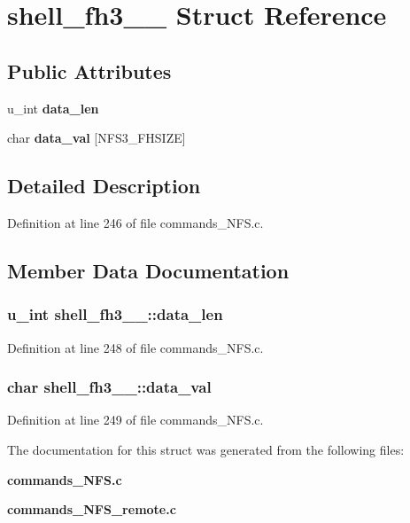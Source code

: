 \section{shell\_\-fh3\_\-\_\- Struct Reference}
\label{structshell__fh3____}
\subsection*{Public Attributes}
\begin{CompactItemize}
\item 
u\_\-int {\bf data\_\-len}
\item 
char {\bf data\_\-val} [NFS3\_\-FHSIZE]
\end{CompactItemize}


\subsection{Detailed Description}


Definition at line 246 of file commands\_\-NFS.c.

\subsection{Member Data Documentation}
\subsubsection[{data\_\-len}]{\setlength{\rightskip}{0pt plus 5cm}u\_\-int {\bf shell\_\-fh3\_\-\_\-::data\_\-len}}\label{structshell__fh3_____c6f85b37736c75dd12c1c37d1df0cfe5}




Definition at line 248 of file commands\_\-NFS.c.
\subsubsection[{data\_\-val}]{\setlength{\rightskip}{0pt plus 5cm}char {\bf shell\_\-fh3\_\-\_\-::data\_\-val}}\label{structshell__fh3_____3d763c4c25800302c7d0db07a186e3de}




Definition at line 249 of file commands\_\-NFS.c.

The documentation for this struct was generated from the following files:\begin{CompactItemize}
\item 
{\bf commands\_\-NFS.c}\item 
{\bf commands\_\-NFS\_\-remote.c}\end{CompactItemize}
